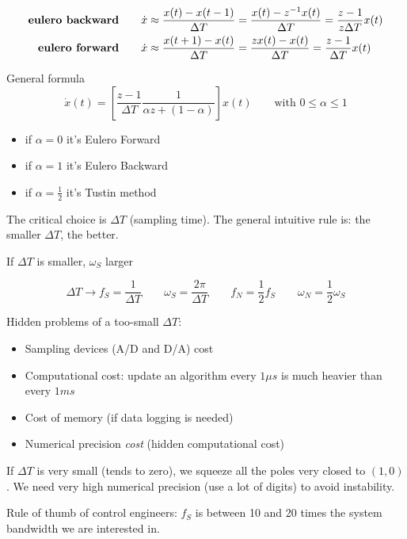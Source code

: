 \begin{align*}
    \text{\textbf{eulero backward}} &\qquad \dot{x} \approx \frac{x(t)-x(t-1)}{\Delta T} = \frac{x(t)-z^{-1}x(t)}{\Delta T} = \frac{z-1}{z\Delta T} x(t) \\
    \text{\textbf{eulero forward}} &\qquad \dot{x} \approx \frac{x(t+1)-x(t)}{\Delta T} = \frac{zx(t)-x(t)}{\Delta T} = \frac{z-1}{\Delta T} x(t)
\end{align*}

General formula
\[
    \dot{x}(t) = \left[ \frac{z-1}{\Delta T} \frac{1}{\alpha z + (1-\alpha)} \right]x(t) \qquad \text{with } 0 \le \alpha \le 1
\]
\begin{itemize}
    \item if $\alpha = 0$ it's Eulero Forward
    \item if $\alpha = 1$ it's Eulero Backward
    \item if $\alpha = \frac{1}{2}$ it's Tustin method
\end{itemize}

The critical choice is $\Delta T$ (sampling time).
The general intuitive rule is: the smaller $\Delta T$, the better.


If $\Delta T$ is smaller, $\omega_S$ larger


\[
    \Delta T \rightarrow f_S = \frac{1}{\Delta T} \qquad \omega_S = \frac{2\pi}{\Delta T} \qquad f_N = \frac{1}{2} f_S \qquad \omega_N = \frac{1}{2} \omega_S
\]

Hidden problems of a too-small $\Delta T$:
\begin{itemize}
    \item Sampling devices (A/D and D/A) cost
    \item Computational cost: update an algorithm every $1 \mu s$ is much heavier than every $1 ms$
    \item Cost of memory (if data logging is needed)
    \item Numerical precision \emph{cost} (hidden computational cost)
\end{itemize}


If $\Delta T$ is very small (tends to zero), we squeeze all the poles very closed to $(1,0)$. We need very high numerical precision (use a lot of digits) to avoid instability.

Rule of thumb of control engineers: $f_S$ is between 10 and 20 times the system bandwidth we are interested in.

